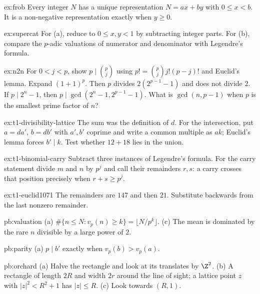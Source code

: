 \begin{hint}{ex:frob}
Every integer $N$ has a unique representation $N=ax+by$ with $0\le x<b$. It is a non-negative representation exactly when $y\ge0$.
\end{hint}
\begin{hint}{ex:supercat}
For (a), reduce to $0\le x,y<1$ by subtracting integer parts. For (b), compare the $p$-adic valuations of numerator and denominator with Legendre's formula.
\end{hint}
\begin{hint}{ex:n2n}
For $0<j<p$, show $p\mid\binom pj$ using $p!=\binom pj j!(p-j)!$ and Euclid's lemma. Expand $(1+1)^p$. Then $p$ divides $2(2^{p-1}-1)$ and does not divide $2$. If $p\mid2^n-1$, then $p\mid\gcd(2^n-1,2^{p-1}-1)$. What is $\gcd(n,p-1)$ when $p$ is the smallest prime factor of $n$?
\end{hint}

\begin{hint}{ex:t1-divisibility-lattice}
The sum was the definition of $d$. For the intersection, put $a=da'$, $b=db'$ with $a',b'$ coprime and write a common multiple as $ak$; Euclid's lemma forces $b'\mid k$. Test whether $12+18$ lies in the union.
\end{hint}
\begin{hint}{ex:t1-binomial-carry}
Subtract three instances of Legendre's formula. For the carry statement divide $m$ and $n$ by $p^j$ and call their remainders $r,s$: a carry crosses that position precisely when $r+s\ge p^j$.
\end{hint}

\begin{hint}{ex:t1-euclid1071}
The remainders are $147$ and then $21$. Substitute backwards from the last nonzero remainder.
\end{hint}

\begin{hint}{pb:valuation}
(a) $\#\{n\le N:v_p(n)\ge k\}=\lfloor N/p^k\rfloor$. (c) The mean is dominated by the rare $n$ divisible by a large power of $2$.
\end{hint}

\begin{hint}{pb:parity}
(a) $p\mid b'$ exactly when $v_p(b)>v_p(a)$.
\end{hint}

\begin{hint}{pb:orchard}
(a) Halve the rectangle and look at its translates by $\Z^2$. (b) A rectangle of length $2R$ and width $2r$ around the line
of sight; a lattice point $z$ with $|z|^2<R^2+1$ has $|z|\le R$. (c) Look towards $(R,1)$.
\end{hint}

